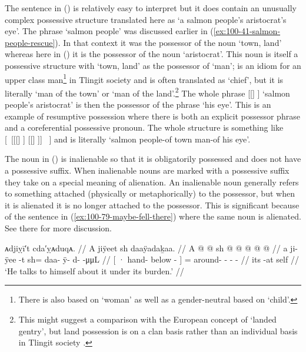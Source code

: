 The sentence in (\lastx) is relatively easy to interpret but it does contain an unusually complex possessive structure translated here as ‘a salmon people’s aristocrat’s eye’.
The phrase  ‘salmon people’ was discussed earlier in (\ref{ex:100-41-salmon-people-rescue}).
In that context it was the possessor of the noun  ‘town, land’ whereas here in (\lastx) it is the possessor of the noun  ‘aristocrat’.
This noun is itself a possessive structure with  ‘town, land’ as the possessor of  ‘man’;  is an idiom for an upper class man\footnote{There is also  based on  ‘woman’ as well as a gender-neutral  based on  ‘child’.} in Tlingit society and is often translated as ‘chief’, but it is literally ‘man of the town’ or ‘man of the land’.\footnote{This might suggest a comparison with the European concept of ‘landed gentry’, but land possession is on a clan basis rather than an individual basis in Tlingit society \parencites{goldschmidt-haas:1998}{thornton:2012}.} The whole phrase [[] ] ‘salmon people’s aristocrat’ is then the possessor of the phrase  ‘his eye’.
This is an example of resumptive possession where there is both an explicit possessor phrase and a coreferential possessive pronoun.
The whole structure is something like [~[[[] ] [[] ]]  ~] and is literally ‘salmon people-of town man-of his eye’.

The noun  in (\lastx) is inalienable so that it is obligatorily possessed and does not have a possessive suffix.
When inalienable nouns are marked with a possessive suffix they take on a special meaning of alienation.
An inalienable noun generally refers to something attached (physically or metaphorically) to the possessor, but when it is alienated it is no longer attached to the possessor.
This is significant because of the sentence in (\ref{ex:100-79-maybe-fell-there}) where the same noun is alienated.
See there for more discussion.

\ex\label{ex:100-75-talk-self-burden}%
%
\begingl
	\glpreamble	ᴀdjiỵī′t cda′ỵᴀduqᴀ. //
	\glpreamble	A jiÿeet sh daaÿadaḵaa. //
	\gla	{} A  @ {} @ {} {} 
		sh @  @ {} @ {} @ {} @ {} //
	\glb	{} a ji- ÿee -t {} 
		sh= daa- ÿ- d-  -μμL //
	\glc	{}[ · hand- below - {}]
		= around- - -  - //
	\gld	{} its  {} -at {}
		self  {} {} {} {} //
	\glft	‘He talks to himself about it under its burden.’
		//
\endgl
\xe

